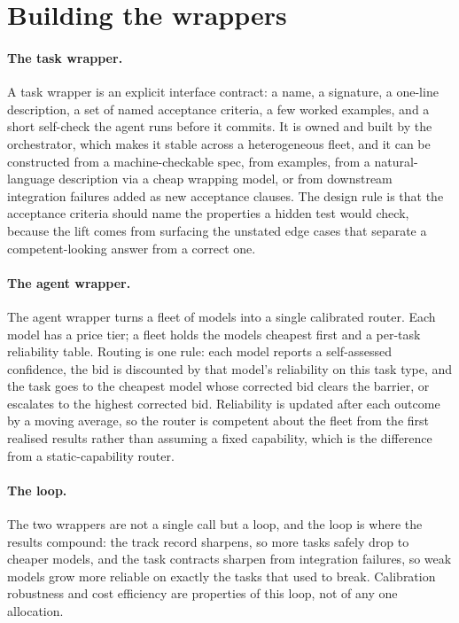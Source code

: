 \documentclass[11pt]{article}
\begin{document}
\section{Building the wrappers}

\paragraph{The task wrapper.} A task wrapper is an explicit interface contract: a name, a signature, a one-line description, a set of named acceptance criteria, a few worked examples, and a short self-check the agent runs before it commits. It is owned and built by the orchestrator, which makes it stable across a heterogeneous fleet, and it can be constructed from a machine-checkable spec, from examples, from a natural-language description via a cheap wrapping model, or from downstream integration failures added as new acceptance clauses. The design rule is that the acceptance criteria should name the properties a hidden test would check, because the lift comes from surfacing the unstated edge cases that separate a competent-looking answer from a correct one.

\paragraph{The agent wrapper.} The agent wrapper turns a fleet of models into a single calibrated router. Each model has a price tier; a fleet holds the models cheapest first and a per-task reliability table. Routing is one rule: each model reports a self-assessed confidence, the bid is discounted by that model's reliability on this task type, and the task goes to the cheapest model whose corrected bid clears the barrier, or escalates to the highest corrected bid. Reliability is updated after each outcome by a moving average, so the router is competent about the fleet from the first realised results rather than assuming a fixed capability, which is the difference from a static-capability router.

\paragraph{The loop.} The two wrappers are not a single call but a loop, and the loop is where the results compound: the track record sharpens, so more tasks safely drop to cheaper models, and the task contracts sharpen from integration failures, so weak models grow more reliable on exactly the tasks that used to break. Calibration robustness and cost efficiency are properties of this loop, not of any one allocation.
\end{document}
